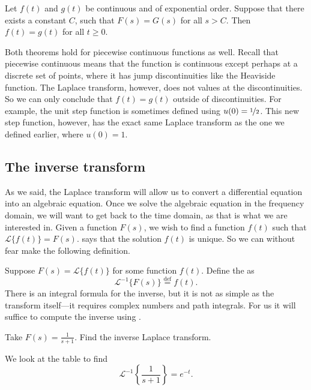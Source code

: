 \begin{theorem}[Uniqueness] \label{lt:uniqthm}
Let $f(t)$ and $g(t)$ be continuous and of exponential order.
Suppose that there exists a constant $C$,
such that $F(s) = G(s)$ for all $s > C$.
Then $f(t) = g(t)$ for all $t \geq 0$.
\end{theorem}

Both theorems hold for piecewise continuous functions as well.
Recall that piecewise continuous means that the function
is continuous except perhaps at a discrete set of points, where it has jump
discontinuities like the Heaviside function.  The Laplace transform, however, does
not  values at the discontinuities.  So we can only conclude that
$f(t) = g(t)$ outside of discontinuities.  For example, the unit step
function is sometimes defined using $u(0) = \nicefrac{1}{2}$.  This new
step function, however, has the exact same Laplace transform
as the one we defined earlier, where $u(0) = 1$.

\subsection{The inverse transform}

As we said, the Laplace transform will allow us to convert a differential
equation into an algebraic equation.  Once we solve the
algebraic equation in the frequency domain, we will want to get back to the
time domain, as that is what we are interested in.
Given a function
$F(s)$, we wish to find a function
$f(t)$ such that $\mathcal{L} \bigl\{ f(t) \bigr\} = F(s)$.
 says that the solution $f(t)$ is unique.
So we can without fear make the following definition.

Suppose $F(s) = \mathcal{L} \bigl\{ f(t) \bigr\}$ for some function $f(t)$.
Define the
\emph{} as
\begin{equation*}
{\mathcal{L}}^{-1} \bigl\{ F(s) \bigr\} \overset{\text{def}}{=} f(t) .
\end{equation*}
There is an integral formula for the inverse, but it is not as simple
as the transform itself---it requires complex numbers and path integrals.
For us it will
suffice to
compute the inverse using .

\begin{example}
Take
$F(s) = \frac{1}{s+1}$.  Find the inverse Laplace transform.

We look at the table to find
\begin{equation*}
{\mathcal{L}}^{-1} \left\{ \frac{1}{s+1} \right\} = 
e^{-t} .
\end{equation*}
\end{example}

